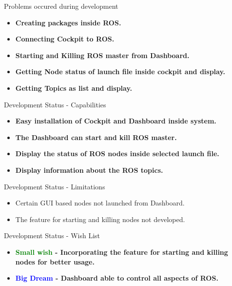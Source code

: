 \documentclass[aspectratio=169]{beamer}
\begin{document}
\begin{frame}{Problems occured during development}
\vspace*{-15mm}
\linespread{2}
	\begin{itemize}
	\item \bf Creating packages inside ROS.
	\item \bf Connecting Cockpit to ROS.
	\item \bf Starting and Killing ROS master from Dashboard.
	\item \bf Getting Node status of launch file inside cockpit and display. 
	\item \bf Getting Topics as list and display.
	\end{itemize}
\end{frame}

\begin{frame}{Development Status - Capabilities}
\vspace*{-15mm}
\linespread{2}
	\begin{itemize}
	\item \bf Easy installation of Cockpit and Dashboard inside system.
	\item \bf The Dashboard can start and kill ROS master.
	\item \bf Display the status of ROS nodes inside selected launch file. 
	\item \bf Display information about the ROS topics.
	\end{itemize}
\end{frame}

\begin{frame}{Development Status - Limitations}
\vspace*{-15mm}
\linespread{2}
	\begin{itemize}
	\item Certain GUI based nodes not launched from Dashboard.
	\item The feature for starting and killing nodes not developed.
	\end{itemize}
\end{frame}

\begin{frame}{Development Status - Wish List}
\vspace*{-15mm}
\linespread{2}
	\begin{itemize}
	\item \bf \textcolor{green}{Small wish} - Incorporating the feature for starting and killing nodes for better usage.
	\item \bf \textcolor{blue}{Big Dream} - Dashboard able to control all aspects of ROS.
	\end{itemize}
\end{frame}
\end{document}
